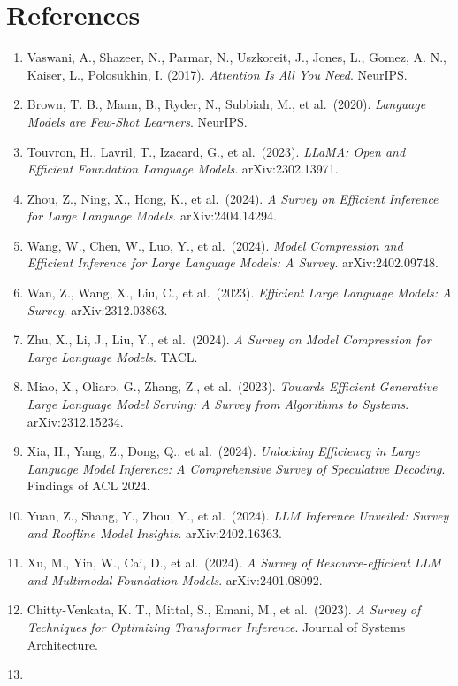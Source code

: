 \section{References}\label{references}

\begin{enumerate}
\def\labelenumi{\arabic{enumi}.}
\tightlist
\item
  Vaswani, A., Shazeer, N., Parmar, N., Uszkoreit, J., Jones, L., Gomez, A. N., Kaiser, L., Polosukhin, I. (2017). \emph{Attention Is All You Need}. NeurIPS.
\item
  Brown, T. B., Mann, B., Ryder, N., Subbiah, M., et al.~(2020). \emph{Language Models are Few-Shot Learners}. NeurIPS.
\item
  Touvron, H., Lavril, T., Izacard, G., et al.~(2023). \emph{LLaMA: Open and Efficient Foundation Language Models}. arXiv:2302.13971.
\item
  Zhou, Z., Ning, X., Hong, K., et al.~(2024). \emph{A Survey on Efficient Inference for Large Language Models}. arXiv:2404.14294.
\item
  Wang, W., Chen, W., Luo, Y., et al.~(2024). \emph{Model Compression and Efficient Inference for Large Language Models: A Survey}. arXiv:2402.09748.
\item
  Wan, Z., Wang, X., Liu, C., et al.~(2023). \emph{Efficient Large Language Models: A Survey}. arXiv:2312.03863.
\item
  Zhu, X., Li, J., Liu, Y., et al.~(2024). \emph{A Survey on Model Compression for Large Language Models}. TACL.
\item
  Miao, X., Oliaro, G., Zhang, Z., et al.~(2023). \emph{Towards Efficient Generative Large Language Model Serving: A Survey from Algorithms to Systems}. arXiv:2312.15234.
\item
  Xia, H., Yang, Z., Dong, Q., et al.~(2024). \emph{Unlocking Efficiency in Large Language Model Inference: A Comprehensive Survey of Speculative Decoding}. Findings of ACL 2024.
\item
  Yuan, Z., Shang, Y., Zhou, Y., et al.~(2024). \emph{LLM Inference Unveiled: Survey and Roofline Model Insights}. arXiv:2402.16363.
\item
  Xu, M., Yin, W., Cai, D., et al.~(2024). \emph{A Survey of Resource-efficient LLM and Multimodal Foundation Models}. arXiv:2401.08092.
\item
  Chitty-Venkata, K. T., Mittal, S., Emani, M., et al.~(2023). \emph{A Survey of Techniques for Optimizing Transformer Inference}. Journal of Systems Architecture.
\item

\end{enumerate}
